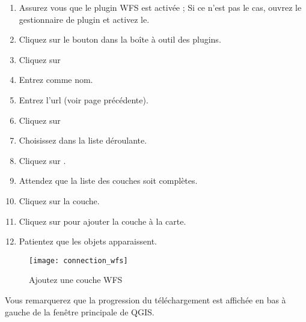 \begin{enumerate}
  \item Assurez vous que le plugin WFS est activée ; Si ce n'est pas le cas,
ouvrez le gestionnaire de plugin et activez le.
  \item Cliquez sur le bouton  dans la boîte à outil des plugins.
  \item Cliquez sur  
  \item Entrez  comme nom.
\item Entrez l'url (voir page précédente).
\item Cliquez sur 
  \item Choisissez  dans la
liste déroulante.
\item Cliquez sur .
\item Attendez que la liste des couches soit complètes.
\item Cliquez sur la couche.
\item Cliquez sur  pour ajouter la couche à la carte.
\item Patientez que les objets apparaissent.
\end{enumerate}

\begin{figure}[ht]
  \begin{center}
 \caption{Ajoutez une couche WFS\nixcaption}\label{fig:wfs_dmsolutions}
 \texttt{[image: connection\_wfs]}
  \end{center}
\end{figure}
Vous remarquerez que la progression du téléchargement est affichée en bas à
gauche de la fenêtre principale de QGIS.

